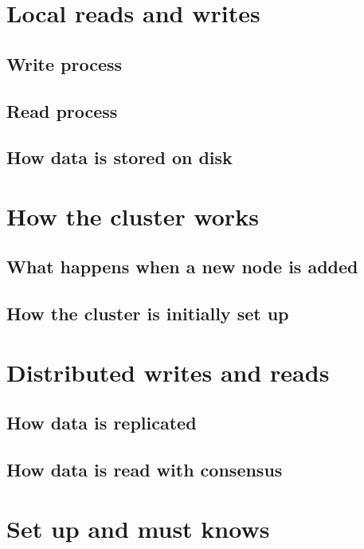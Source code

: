 \documentclass[10pt]{beamer}
\begin{document}
\section{Local reads and writes}  %
\subsection{Write process}
\subsection{Read process}
\subsection{How data is stored on disk}

\section{How the cluster works}  %
\subsection{What happens when a new node is added}
\subsection{How the cluster is initially set up}

\section{Distributed writes and reads}  %
\subsection{How data is replicated}
\subsection{How data is read with consensus}

\section{Set up and must knows}  %
\end{document}
